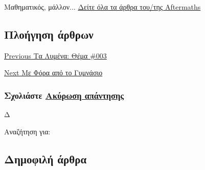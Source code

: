 \documentclass[
]{article}
\begin{document}
Μαθηματικός, μάλλον...
\href{https://aftermathsgr.wordpress.com/author/aftermathsgr/}{Δείτε όλα
τα άρθρα του/της Aftermaths}

\hypertarget{ux3c0ux3bbux3bfux3aeux3b3ux3b7ux3c3ux3b7-ux3acux3c1ux3b8ux3c1ux3c9ux3bd}{%
\subsection{Πλοήγηση
άρθρων}\label{ux3c0ux3bbux3bfux3aeux3b3ux3b7ux3c3ux3b7-ux3acux3c1ux3b8ux3c1ux3c9ux3bd}}

\href{https://aftermathsgr.wordpress.com/2024/07/25/\%cf\%84\%ce\%b1-\%ce\%bb\%cf\%85\%ce\%bc\%ce\%ad\%ce\%bd\%ce\%b1-\%ce\%b8\%ce\%ad\%ce\%bc\%ce\%b1-003/}{{Previous}
Τα Λυμένα: Θέμα \#003}

\href{https://aftermathsgr.wordpress.com/2024/10/01/\%ce\%bc\%ce\%b5-\%cf\%86\%cf\%8c\%cf\%81\%ce\%b1-\%ce\%b1\%cf\%80\%cf\%8c-\%cf\%84\%ce\%bf-\%ce\%b3\%cf\%85\%ce\%bc\%ce\%bd\%ce\%ac\%cf\%83\%ce\%b9\%ce\%bf/}{{Next}
Με Φόρα από το Γυμνάσιο}

\hypertarget{comments}{}
\hypertarget{respond}{}
\hypertarget{reply-title}{%
\subsubsection{\texorpdfstring{Σχολιάστε
{\protect\hypertarget{cancel-comment-reply-link}{\href{/2024/08/04/\%cf\%84\%ce\%b1-\%ce\%bf\%ce\%bb\%cf\%85\%ce\%bc\%cf\%80\%ce\%b9\%ce\%b1\%ce\%ba\%ce\%ac-\%cf\%85\%ce\%b4\%cf\%81\%ce\%bf\%ce\%b8\%ce\%b5\%cf\%81\%ce\%bc\%ce\%b9\%ce\%ba\%ce\%ad\%cf\%82-\%cf\%83\%cf\%85\%ce\%bd\%ce\%b1\%cf\%81\%cf\%84\%ce\%ae\%cf\%83\%ce\%b5/\#respond}{Ακύρωση
απάντησης}}}}{Σχολιάστε Ακύρωση απάντησης}}\label{reply-title}}

Δ

\hypertarget{secondary}{}
{Αναζήτηση για:}

\hypertarget{ux3b4ux3b7ux3bcux3bfux3c6ux3b9ux3bbux3ae-ux3acux3c1ux3b8ux3c1ux3b1}{%
\subsection{Δημοφιλή
άρθρα}\label{ux3b4ux3b7ux3bcux3bfux3c6ux3b9ux3bbux3ae-ux3acux3c1ux3b8ux3c1ux3b1}}
\end{document}
